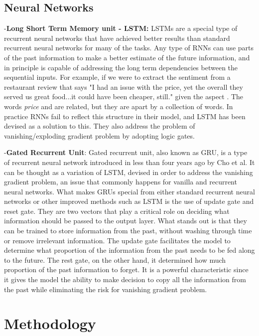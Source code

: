 \documentclass[comsoc,conference]{IEEEtran}
\begin{document}
\subsection{Neural Networks}
-\textbf{Long Short Term Memory unit - LSTM:} LSTMs are a special type of recurrent neural networks that have achieved better results than standard recurrent neural networks for many of the tasks. Any type of RNNs can use parts of the past information to make a better estimate of the future information, and in principle is capable of addressing the long term dependencies between the sequential inputs. For example, if we were to extract the sentiment from a restaurant review that says "I had an issue with the price, yet the overall they served us great food...it could have been cheaper, still." given the aspect . The words \textit{price} and  are related, but they are apart by a collection of words. In practice RNNs fail to reflect this structure in their model, and LSTM has been devised as a solution to this. They also address the problem of vanishing/exploding gradient problem by adopting logic gates.

-\textbf{Gated Recurrent Unit}: Gated recurrent unit, also known as GRU, is a type of recurrent neural network introduced in less than four years ago by Cho et al. It can be thought as a variation of LSTM, devised in order to address the vanishing gradient problem, an issue that commonly happens for vanilla and recurrent neural networks. What makes GRUs special from either standard recurrent neural networks or other improved methods such as LSTM is the use of update gate and reset gate. They are two vectors that play a critical role on deciding what information should be passed to the output layer. What stands out is that they can be trained to store information from the past, without washing through time or remove irrelevant information.  
The update gate facilitates the model to determine what proportion of the information from the past needs to be fed along to the future. The rest gate, on the other hand, it determined how much proportion of the past information to forget. It is a powerful characteristic since it gives the model the ability to make decision to copy all the information from the past while eliminating the risk for vanishing gradient problem.

\newpage

\section{Methodology}
\end{document}
